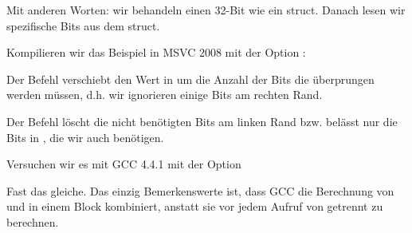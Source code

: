 Mit anderen Worten: wir behandeln einen 32-Bit \Tint wie ein struct.
Danach lesen wir spezifische Bits aus dem struct.

Kompilieren wir das Beispiel in MSVC 2008 mit der Option \Ox:



Der Befehl  verschiebt den Wert in \EAX um die Anzahl der Bits die überprungen werden müssen, d.h. wir
ignorieren einige Bits am rechten Rand.

Der Befehl \AND löscht die nicht benötigten Bits am linken Rand bzw. belässt nur die Bits in \EAX, die wir auch
benötigen.



Versuchen wir es mit GCC 4.4.1 mit der Option \Othree


Fast das gleiche. Das einzig Bemerkenswerte ist, dass GCC die Berechnung von  und
 in einem Block kombiniert, anstatt sie vor jedem Aufruf von \printf getrennt zu berechnen.
